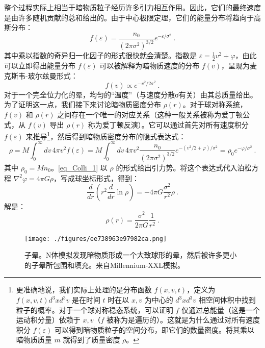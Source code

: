 整个过程实际上相当于暗物质粒子经历许多引力相互作用。因此，它们的最终速度是由许多随机贡献的总和给出的。由于中心极限定理，它们的能量分布将趋向于高斯分布：
\begin{equation}
 f(\varepsilon) =   \frac{n_0}{(2\pi\sigma^2)^{3/2}}  e^{-\varepsilon/\sigma^2} ~. 
\end{equation}
其中乘以指数的奇异归一化因子的形式很快就会清楚。指数是 \(\varepsilon = \frac{1}{2}v^2 + \varphi\)，由此可以立即得出能量分布 \(f(\varepsilon)\) 可以被解释为暗物质速度的分布 \(f(v)\)，呈现为麦克斯韦-玻尔兹曼形式：
\begin{equation}
 f(v) \propto e^{-v^2/2\sigma^2}~. 
\end{equation}
对于一个完全位力化的晕，均匀的“温度”（与速度分散σ有关）由其总质量给出。为了证明这一点，我们接下来讨论暗物质密度分布 \(\rho(r)\)。对于球对称系统，\(f(v)\) 和 \(\rho(r)\) 之间存在一个唯一的对应关系（这种一般关系被称为爱丁顿公式，从 \(f(v)\) 导出 \(\rho(r)\) 称为爱丁顿反演）。它可以通过首先对所有速度积分 \(f(\varepsilon)\) 来推导\footnote{更准确地说，我们实际上处理的是分布函数 \(f(x, v, t)\)，定义为 \(f(x, v, t) d^3x d^3v\) 是在时间 \(t\) 时在以 \(x, v\) 为中心的 $d^3x d^3v$ 相空间体积中找到粒子的概率。对于一个球对称稳态系统，可以证明 \(f\) 仅通过总能量（这是一个运动积分量）依赖于 \(x, v\)（\(f\) 被称为是遍历的）。这就是为什么通过对所有速度积分 \(f(\varepsilon)\) 可以得到暗物质粒子的空间分布，即它们的数量密度。将其乘以暗物质质量 \(m\) 就得到了质量密度 \(\rho\)。}，然后得到暗物质密度分布的隐式表达式：
\begin{equation}\label{eq_Colli_1}
 \rho = M \int_0^\infty dv \, 4\pi v^2 f(\varepsilon) = M \int_0^\infty dv \, 4\pi v^2 \frac{n_0}{(2\pi\sigma^2)^{3/2}} e^{-(v^2/2+\varphi)/\sigma^2} = \rho_0 e^{-\varphi/\sigma^2}~. 
\end{equation}
其中 \(\rho_0 = Mn_0\)。\autoref{eq_Colli_1} 以 \(\rho\) 的形式给出引力势。将这个表达式代入泊松方程 \(\nabla^2\varphi = 4\pi G\rho\)，写成球坐标形式，得到：
\begin{equation}
 \frac{d}{dr} \left( r^2 \frac{d}{dr} \ln\rho \right) = -4\pi G \frac{\sigma^2}{r^2} \rho~. 
\end{equation}
解是：
\begin{equation}\label{eq_Colli_2}
\rho(r) = \frac{\sigma^2}{2\pi G} \frac{1}{r^2}~. 
\end{equation}

\begin{figure}[ht]
\centering
\texttt{[image: ./figures/ee738963e97982ca.png]}
\caption{子晕。N体模拟发现暗物质形成一个大致球形的晕，然后被许多更小的子晕所包围和填充。来自Millennium-XXL模拟。} \label{fig_Colli_2}
\end{figure}

